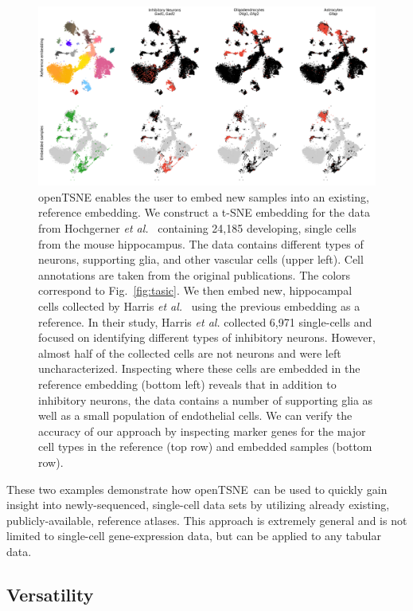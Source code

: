 \documentclass[twocolumn]{bmcart}
\newcommand{\opentsne}{\textsf{openTSNE}}
\begin{document}
\begin{figure}[htbp]
  \includegraphics[width=\textwidth]{transform_hochgerner}
  \caption{\label{fig:transform}openTSNE enables the user to embed new samples into an existing, reference embedding. We construct a t-SNE embedding for the data from Hochgerner \textit{et al.}~\cite{hochgerner2018conserved} containing 24,185 developing, single cells from the mouse hippocampus. The data contains different types of neurons, supporting glia, and other vascular cells (upper left). Cell annotations are taken from the original publications. The colors correspond to Fig.~\ref{fig:tasic}. We then embed new, hippocampal cells collected by Harris \textit{et al.}~\cite{harris2018classes} using the previous embedding as a reference. In their study, Harris \textit{et al.} collected 6,971 single-cells and focused on identifying different types of inhibitory neurons. However, almost half of the collected cells are not neurons and were left uncharacterized. Inspecting where these cells are embedded in the reference embedding (bottom left) reveals that in addition to inhibitory neurons, the data contains a number of supporting glia as well as a small population of endothelial cells. We can verify the accuracy of our approach by inspecting marker genes for the major cell types in the reference (top row) and embedded samples (bottom row).}
\end{figure}

These two examples demonstrate how \opentsne\ can be used to quickly gain insight into newly-sequenced, single-cell data sets by utilizing already existing, publicly-available, reference atlases. This approach is extremely general and is not limited to single-cell gene-expression data, but can be applied to any tabular data.

\subsection*{Versatility}
\end{document}
